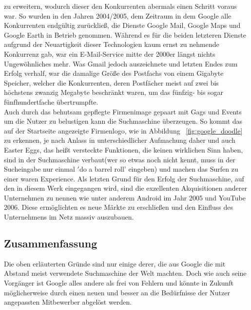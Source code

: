 zu erweitern, wodurch dieser den Konkurrenten abermals einen Schritt voraus war.
So wurden in den Jahren 2004/2005, dem Zeitraum in dem Google alle Konkurrenten endgültig zurückließ, die Dienste Google Mail,
Google Maps und Google Earth in Betrieb genommen.
Während es für die beiden letzteren Dienste aufgrund der Neuartigkeit dieser Technologien kaum ernst zu nehmende
Konkurrenz gab, war ein E-Mail-Service mitte der 2000er längst nichts Ungewöhnliches mehr.
Was Gmail jedoch auszeichnete und letzten Endes zum Erfolg verhalf, war die damalige Größe des Postfachs von einem
Gigabyte Speicher, welcher die Konkurrenten, deren Postfächer meist auf zwei bis höchstens zwanzig Megabyte beschränkt
waren, um das fünfzig- bis sogar fünfhundertfache übertrumpfte.
\\
Auch durch das behutsam gepflegte Firmenimage gepaart mit Gags und Events um die Nutzer zu belustigen kann
die Suchmaschine überzeugen.
So kommt das auf der Startseite angezeigte Firmenlogo, wie in Abbildung ~\ref{fig:google_doodle} zu erkennen, je nach Anlass in
unterschiedlicher Aufmachung daher und auch Easter Eggs, das heißt versteckte Funktionen, die keinen wirklichen Sinn haben,
sind in der Suchmaschine verbaut(wer so etwas noch nicht kennt, muss in der Sucheingabe nur einmal \('\)do a barrel roll' eingeben)
und machen das Surfen zu einer waren Experience.
Als letzten Grund für den Erfolg der Suchmaschine, auf den in diesem Werk eingegangen wird, sind die exzellenten
Akquisitionen anderer Unternehmen zu nennen wie unter anderem Android im Jahr 2005 und YouTube 2006.
Diese ermöglichten es neue Märkte zu erschließen und den Einfluss des Unternehmens im Netz massiv auszubauen.

\subsection{Zusammenfassung}\label{subsec:zusammenfassung}
Die oben erläuterten Gründe sind nur einige derer, die aus Google die mit Abstand meist verwendete Suchmaschine der Welt
machten.
Doch wie auch seine Vorgänger ist Google alles andere als frei von Fehlern und könnte in Zukunft möglicherweise durch einen
neuen und besser an die Bedürfnisse der Nutzer angepassten Mitbewerber abgelöst werden.